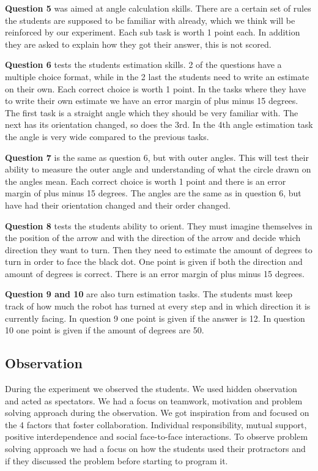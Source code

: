 \bigskip\noindent
\textbf{Question 5} was aimed at angle calculation skills. There are a certain set of rules the students are supposed to be familiar with already, which we think will be reinforced by our experiment. Each sub task is worth 1 point each. In addition they are asked to explain how they got their answer, this is not scored.

\bigskip\noindent
\textbf{Question 6} tests the students estimation skills. 2 of the questions have a multiple choice format, while in the 2 last the students need to write an estimate on their own. Each correct choice is worth 1 point. In the tasks where they have to write their own estimate we have an error margin of plus minus 15 degrees. The first task is a straight angle which they should be very familiar with. The next has its orientation changed, so does the 3rd. In the 4th angle estimation task the angle is very wide compared to the previous tasks. 

\bigskip\noindent
\textbf{Question 7} is the same as question 6, but with outer angles. This will test their ability to measure the outer angle and understanding of what the circle drawn on the angles mean. Each correct choice is worth 1 point and there is an error margin of plus minus 15 degrees. The angles are the same as in question 6, but have had their orientation changed and their order changed. 

\bigskip\noindent
\textbf{Question 8} tests the students ability to orient. They must imagine themselves in the position of the arrow and with the direction of the arrow and decide which direction they want to turn. Then they need to estimate the amount of degrees to turn in order to face the black dot. One point is given if both the direction and amount of degrees is correct. There is an error margin of plus minus 15 degrees. 

\bigskip\noindent
\textbf{Question 9 and 10} are also turn estimation tasks. The students must keep track of how much the robot has turned at every step and in which direction it is currently facing. In question 9 one point is given if the answer is 12. In question 10 one point is given if the amount of degrees are 50. 

\subsection{Observation}
During the experiment we observed the students. We used hidden observation and acted as spectators. We had a focus on teamwork, motivation and problem solving approach during the observation. We got inspiration from  and focused on the 4 factors that foster collaboration. Individual responsibility, mutual support, positive interdependence and social face-to-face interactions. To observe problem solving approach we had a focus on how the students used their protractors and if they discussed the problem before starting to program it.

